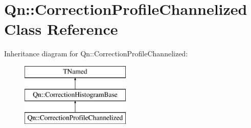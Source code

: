 \hypertarget{classQn_1_1CorrectionProfileChannelized}{}\section{Qn\+:\+:Correction\+Profile\+Channelized Class Reference}
\label{classQn_1_1CorrectionProfileChannelized}
Inheritance diagram for Qn\+:\+:Correction\+Profile\+Channelized\+:\begin{figure}[H]
\begin{center}
\leavevmode
\includegraphics[height=3.000000cm]{classQn_1_1CorrectionProfileChannelized}
\end{center}
\end{figure}
